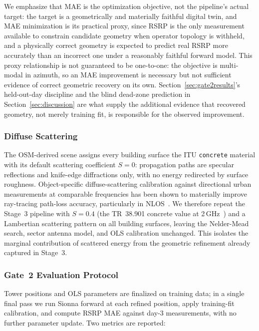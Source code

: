 \documentclass[conference]{IEEEtran}
\begin{document}
We emphasize that MAE is the optimization objective, not the pipeline's
actual target: the target is a geometrically and materially faithful
digital twin, and MAE minimization is its practical proxy, since RSRP is
the only measurement available to constrain candidate geometry when
operator topology is withheld, and a physically correct geometry is
expected to predict real RSRP more accurately than an incorrect one
under a reasonably faithful forward model. This proxy relationship is
not guaranteed to be one-to-one: the objective is multi-modal in
azimuth, so an MAE improvement is necessary but not sufficient evidence
of correct geometric recovery on its own. Section~\ref{sec:gate2results}'s
held-out-day discipline and the blind dead-zone prediction in
Section~\ref{sec:discussion} are what supply the additional evidence
that recovered geometry, not merely training fit, is responsible for
the observed improvement.

\subsubsection{Diffuse Scattering}
\label{sec:scattering}

The OSM-derived scene assigns every building surface the ITU \texttt{concrete}
material with its default scattering coefficient $S=0$: propagation paths
are specular reflections and knife-edge diffractions only, with no energy
redirected by surface roughness.
Object-specific diffuse-scattering calibration against directional urban
measurements at comparable frequencies has been shown to materially improve
ray-tracing path-loss accuracy, particularly in
NLOS~\cite{jarvis2020calibration}.
We therefore repeat the Stage~3 pipeline with $S=0.4$ (the TR~38.901
concrete value at 2\,GHz~\cite{3gpp38901}) and a Lambertian scattering
pattern on all building surfaces, leaving the Nelder-Mead search, sector
antenna model, and OLS calibration unchanged.
This isolates the marginal contribution of scattered energy from the
geometric refinement already captured in Stage~3.

\subsubsection{Gate~2 Evaluation Protocol}

Tower positions and OLS parameters are finalized on training data; in a
single final pass we run Sionna forward at each refined position, apply
training-fit calibration, and compute RSRP MAE against day-3
measurements, with no further parameter update. Two metrics are
reported:
\end{document}
